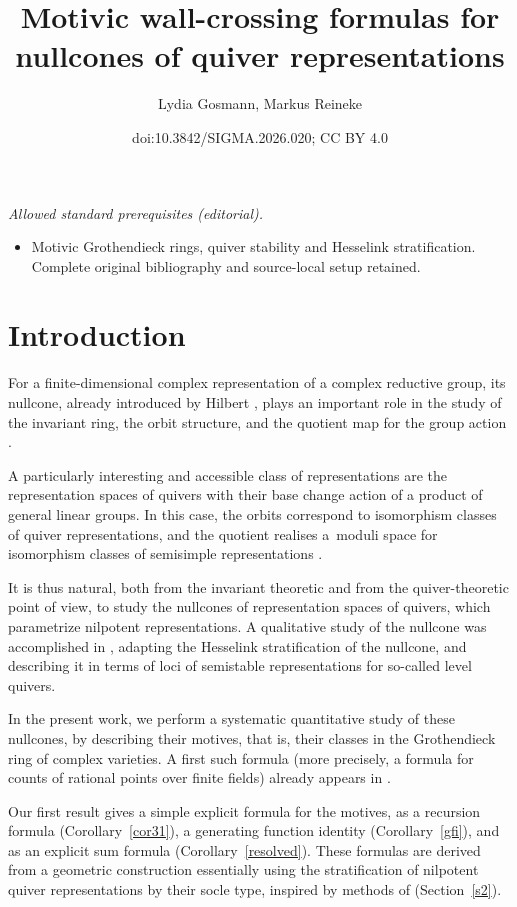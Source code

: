 \documentclass[10pt,a4paper]{amsart}
\title{Motivic wall-crossing formulas for nullcones of quiver representations}
\author{Lydia Gosmann, Markus Reineke}
\date{doi:10.3842/SIGMA.2026.020; CC BY 4.0}
\numberwithin{equation}{section}
\theoremstyle{definition}
\begin{document}
\maketitle
\noindent\textit{Allowed standard prerequisites (editorial).}\begin{itemize}
\item Motivic Grothendieck rings, quiver stability and Hesselink stratification. Complete original bibliography and source-local setup retained.
\end{itemize}\medskip
\section{Introduction}

For a finite-dimensional complex representation of a complex reductive group, its nullcone, already introduced by Hilbert \cite{H}, plays an important role in the study of the invariant ring, the orbit structure, and the quotient map for the group action \cite{KW}.

A particularly interesting and accessible class of representations are the representation spaces of quivers with their base change action of a product of general linear groups. In this case, the orbits correspond to isomorphism classes of quiver representations, and the quotient realises a~moduli space for isomorphism classes of semisimple representations \cite{LP}.

It is thus natural, both from the invariant theoretic and from the quiver-theoretic point of view, to study the nullcones of representation spaces of quivers, which parametrize nilpotent representations. A qualitative study of the nullcone was accomplished in \cite{LB}, adapting the Hesselink stratification of the nullcone, and describing it in terms of loci of semistable representations for so-called level quivers.

In the present work, we perform a systematic quantitative study of these nullcones, by describing their motives, that is, their classes in the Grothendieck ring of complex varieties. A first such formula (more precisely, a formula for counts of rational points over finite fields) already appears in \cite[Lemma 2.6]{BSV}.

Our first result gives a simple explicit formula for the motives, as a recursion formula (Corollary~\ref{cor31}), a generating function identity (Corollary~\ref{gfi}), and as an explicit sum formula (Corollary~\ref{resolved}). These formulas are derived from a geometric construction essentially using the stratification of nilpotent quiver representations by their socle type, inspired by methods of \cite{RCounting} (Section~\ref{s2}).
\end{document}

